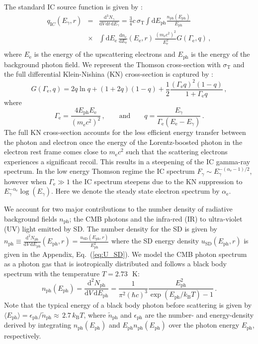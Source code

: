 \documentclass[10pt,aps,pra,reprint,amsmath,amsfonts,amssymb,showpacs,nofootinbib,floatfix]{revtex4-1}
\newcommand{\rmn}{\mathrm}
\newcommand{\ph}{\rmn{ph}}
\newcommand{\eph}{E_\ph}
\newcommand{\sd}{\rmn{SD}}
\newcommand{\ee}{E_\rmn{e}}
\newcommand{\B}{\rmn{B}}
\newcommand{\dd}{\rmn{d}}
\newcommand{\e}{\rmn{e}}
\newcommand{\eg}{E_\gamma}
\begin{document}
The standard IC source function is given by
\cite{1979rpa..book.....R}:
\begin{eqnarray}
  q_{\rmn IC}(\eg, r) &=&  \frac{\dd^3 N_\gamma}{\dd V\,\dd t\,\dd \eg} = 
 \frac{3}{4}c\,\sigma_\rmn{T}
\int\dd \eph \frac{n_\rmn{ph}(\eph)}{\eph}\nonumber\\
&\times& \int \dd \ee\,\frac{\dd n_\e}{\dd \ee}(\ee,r)\,
 \frac{\left(m_\e c^2\right)^2}{\ee^2}G(\Gamma_\e,q)\,,\nonumber\\
  \label{eq:ICemiss}
\end{eqnarray}
where $\ee$ is the energy of the upscattering electrons and $\eph$ is
the energy of the background photon field. We represent the Thomson
cross-section with $\sigma_\rmn{T}$ and the full differential
Klein-Nishina (KN) cross-section is captured by
\cite{1970RvMP...42..237B}:
\begin{equation}
\label{eq:KN_spec}
G(\Gamma_\e,q) = 2q\ln{q}+(1+2q)(1-q)+ 
\frac{1}{2}\frac{\left(\Gamma_\e q\right)^2\left(1-q\right)}
     {1+\Gamma_\e q}\,,
\end{equation}
where
\begin{equation}
\Gamma_\e=\frac{4\eph \ee}{\left(m_\e c^2\right)^2}\,,\qquad \rmn{and} \qquad  
q=\frac{\eg}{\Gamma_\e\left(\ee-\eg\right)}\,.
\end{equation}
The full KN cross-section accounts for the less efficient energy
transfer between the photon and electron once the energy of the
Lorentz-boosted photon in the electron rest frame comes close to $m_\e
c^2$ such that the scattering electrons experiences a significant
recoil. This results in a steepening of the IC gamma-ray spectrum. In
the low energy Thomson regime the IC spectrum $F_\gamma\sim
E_\gamma^{-(\alpha_\e-1)/2}$, however when $\Gamma_\e \gg 1$ the IC
spectrum steepens due to the KN suppression to
$\eg^{-\alpha_\e}\log(\eg)$. Here we denote the steady state electron
spectrum by $\alpha_\e$.

We account for two major contributions to the number density of
radiative background fields $n_\ph$; the CMB photons and the infra-red
(IR) to ultra-violet (UV) light emitted by SD. The number density for
the SD is given by $n_\ph\equiv\frac{\dd^2 N_\ph}{\dd V \,\dd
  \eph}(\eph,r)= \frac{u_\sd(\eph,r)}{\eph^2}$ where the SD energy
density $u_\sd(\eph,r)$ is given in the Appendix,
Eq.~(\ref{eq:U_SD}). We model the CMB photon spectrum as a photon gas
that is isotropically distributed and follows a black body spectrum
with the temperature $T=2.73\,$~K:
\begin{equation}
\label{eq:photon_gas}
  n_\rmn{ph}(\eph) = \frac{\dd^2 N_\ph}{\dd V \,\dd \eph} =
  \frac{1}{\pi^2(\hbar c)^3}\frac{\eph^2}{\exp(\eph/k_\B T)-1}\,.
\end{equation}
Note that the typical energy of a black body photon before scattering
is given by $\langle\eph\rangle=\epsilon_\ph/\tilde{n}_\ph\approx\,2.7\, k_\B T$,
where $\tilde{n}_\ph$ and $\epsilon_\ph$ are the number- and
energy-density derived by integrating $n_\ph(\eph)$ and $\eph
n_\ph(\eph)$ over the photon energy $\eph$, respectively.
\end{document}
